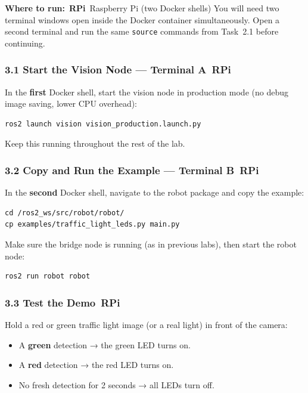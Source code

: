 \documentclass{ol-softwaremanual}
\newcommand{\onrpi}{%
  \,\colorbox{blue!20}{\footnotesize\sffamily\bfseries RPi}}
\newcommand{\machinebox}[2]{%
  \par\noindent
  \colorbox{gray!12}{\parbox{\dimexpr\linewidth-2\fboxsep}{%
    \small\sffamily\textbf{Where to run:} #1 \quad\textbar\quad #2}}%
  \par\smallskip}
\begin{document}
\machinebox{\onrpi\ Raspberry Pi (two Docker shells)}{You will need two terminal windows open inside the Docker container simultaneously. Open a second terminal and run the same \texttt{source} commands from Task~2.1 before continuing.}

\subsubsection*{3.1 Start the Vision Node — Terminal A\onrpi}

In the \textbf{first} Docker shell, start the vision node in production mode
(no debug image saving, lower CPU overhead):

\begin{verbatim}
ros2 launch vision vision_production.launch.py
\end{verbatim}

Keep this running throughout the rest of the lab.

\subsubsection*{3.2 Copy and Run the Example — Terminal B\onrpi}

In the \textbf{second} Docker shell, navigate to the robot package and copy the
example:

\begin{verbatim}
cd /ros2_ws/src/robot/robot/
cp examples/traffic_light_leds.py main.py
\end{verbatim}

Make sure the bridge node is running (as in previous labs), then start the robot
node:

\begin{verbatim}
ros2 run robot robot
\end{verbatim}

\subsubsection*{3.3 Test the Demo\onrpi}

Hold a red or green traffic light image (or a real light) in front of the camera:

\begin{itemize}
  \item A \textbf{green} detection → the green LED turns on.
  \item A \textbf{red} detection → the red LED turns on.
  \item No fresh detection for 2 seconds → all LEDs turn off.
\end{itemize}
\end{document}
